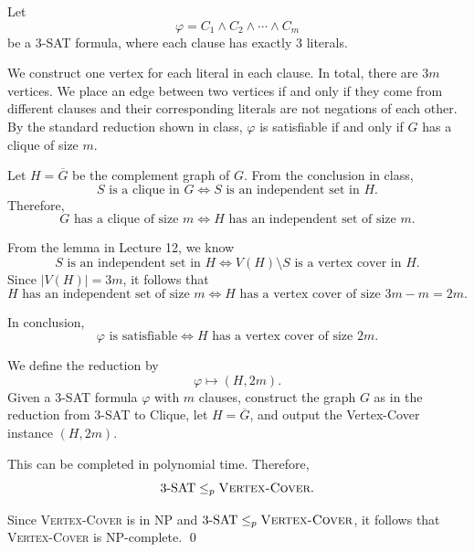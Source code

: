 \documentclass{article}
\begin{document}
Let
\[
\varphi = C_1 \land C_2 \land \cdots \land C_m
\]
be a 3-SAT formula, where each clause has exactly $3$ literals.

We construct one vertex for each literal in each clause. In total, there are $3m$ vertices. We place an edge between two vertices if and only if they come from different clauses and their corresponding literals are not negations of each other. By the standard reduction shown in class, $\varphi$ is satisfiable if and only if $G$ has a clique of size $m$.

Let $H=\overline{G}$ be the complement graph of $G$. From the conclusion in class,
\[
S \text{ is a clique in } G \iff S \text{ is an independent set in } H.
\]
Therefore,
\[
G \text{ has a clique of size } m \iff H \text{ has an independent set of size } m.
\]

From the lemma in Lecture 12, we know
\[
S \text{ is an independent set in } H \iff V(H)\setminus S \text{ is a vertex cover in } H.
\]
Since $|V(H)|=3m$, it follows that
\[
H \text{ has an independent set of size } m
\iff
H \text{ has a vertex cover of size } 3m-m=2m.
\]

In conclusion,
\[
\varphi \text{ is satisfiable}
\iff
H \text{ has a vertex cover of size } 2m.
\]

We define the reduction by
\[
\varphi \mapsto (H,2m).
\]
Given a 3-SAT formula $\varphi$ with $m$ clauses, construct the graph $G$ as in the reduction from 3-SAT to Clique, let $H=\overline{G}$, and output the Vertex-Cover instance $(H,2m)$.

This can be completed in polynomial time. Therefore,
\[
3\text{-SAT} \le_p \textsc{Vertex-Cover}.
\]

Since \textsc{Vertex-Cover} is in NP and $3\text{-SAT} \le_p \textsc{Vertex-Cover}$, it follows that \textsc{Vertex-Cover} is NP-complete. \qed
\end{document}
